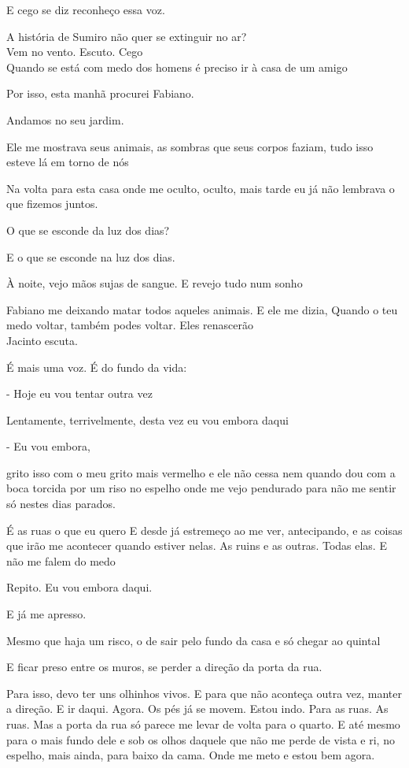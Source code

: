E cego se diz reconheço essa voz.

A história de Sumiro não quer se extinguir no ar?\\

Vem no vento. Escuto. Cego\\

Quando se está com medo dos homens é preciso ir à casa de um amigo

Por isso, esta manhã procurei Fabiano.

Andamos no seu jardim.

Ele me mostrava seus animais, as sombras que seus corpos faziam, tudo
isso esteve lá em torno de nós

Na volta para esta casa onde me oculto, oculto, mais tarde eu já não
lembrava o que fizemos juntos.

O que se esconde da luz dos dias?

E o que se esconde na luz dos dias.

À noite, vejo mãos sujas de sangue. E revejo tudo num sonho

Fabiano me deixando matar todos aqueles animais. E ele me dizia, Quando
o teu medo voltar, também podes voltar. Eles renascerão\\

Jacinto escuta.

É mais uma voz. É do fundo da vida:

- Hoje eu vou tentar outra vez

Lentamente, terrivelmente, desta vez eu vou embora daqui

- Eu vou embora,

grito isso com o meu grito mais vermelho e ele não cessa nem quando dou
com a boca torcida por um riso no espelho onde me vejo pendurado para
não me sentir só nestes dias parados.

É as ruas o que eu quero E desde já estremeço ao me ver, antecipando, e
as coisas que irão me acontecer quando estiver nelas. As ruins e as
outras. Todas elas. E não me falem do medo

Repito. Eu vou embora daqui.

E já me apresso.

Mesmo que haja um risco, o de sair pelo fundo da casa e só chegar ao
quintal

E ficar preso entre os muros, se perder a direção da porta da rua.

Para isso, devo ter uns olhinhos vivos. E para que não aconteça outra
vez, manter a direção. E ir daqui. Agora. Os pés já se movem. Estou
indo. Para as ruas. As ruas. Mas a porta da rua só parece me levar de
volta para o quarto. E até mesmo para o mais fundo dele e sob os olhos
daquele que não me perde de vista e ri, no espelho, mais ainda, para
baixo da cama. Onde me meto e estou bem agora.


